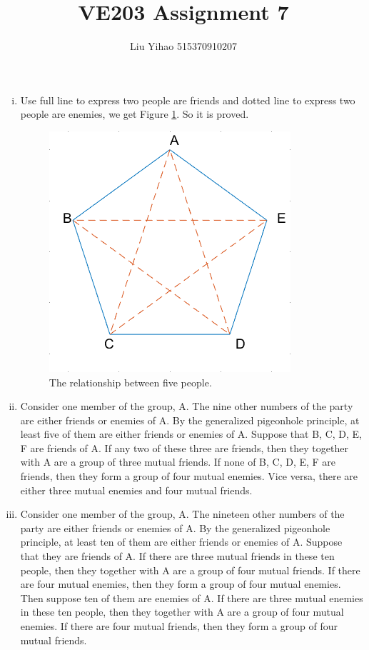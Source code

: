 \documentclass{article}
\title{VE203 Assignment 7}
\author{Liu Yihao 515370910207}
\date{}
\begin{document}
\maketitle

\section{}
\begin{enumerate}[i)]
\item
Use full line to express two people are friends and dotted line to express two people are enemies, we get Figure \ref{e1_1}. So it is proved.

\begin{figure}[H]
	\centering
	\includegraphics[scale=0.4]{e1_1.png}
	\caption{The relationship between five people.}
	\label{e1_1}
\end{figure}

\item
Consider one member of the group, A. The nine other numbers of the party are either friends or enemies of A. By the generalized pigeonhole principle, at least five of them are either friends or enemies of A. Suppose that B, C, D, E, F are friends of A. If any two of these three are friends, then they together with A are a group of three mutual friends. If none of B, C, D, E, F are friends, then they form a group of four mutual enemies. Vice versa, there are either three mutual enemies and four mutual friends.

\item
Consider one member of the group, A. The nineteen other numbers of the party are either friends or enemies of A. By the generalized pigeonhole principle, at least ten of them are either friends or enemies of A. Suppose that they are friends of A. If there are three mutual friends in these ten people, then they together with A are a group of four mutual friends. If there are four mutual enemies, then they form a group of four mutual enemies. Then suppose ten of them are enemies of A. If there are three mutual enemies in these ten people, then they together with A are a group of four mutual enemies. If there are four mutual friends, then they form a group of four mutual friends.


\end{enumerate}
\end{document}
